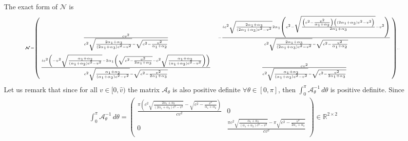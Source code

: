 \documentclass[10pt]{article}
\begin{document}
The exact form of $\boldsymbol{\mathcal{N}}$  is
\begin{align}
\!\!\begin{tiny}\boldsymbol{\mathcal{N}}\!=\!\!	\left(\!\!\!
	\begin{array}{cc}
		\frac{c v^2}{c^2 \sqrt{\frac{2 \alpha _1+\alpha _3}{\left(2 \alpha _1+\alpha _3\right) c^2-v^2}}-\sqrt{c^2-\frac{v^2}{\alpha _1+\alpha _2}}} & -\frac{i c^2 \sqrt{\frac{2 \alpha _1+\alpha _3}{\left(2 \alpha _1+\alpha _3\right) c^2-v^2}} 2 \alpha _1\left( c^2- \sqrt{\frac{\left(c^2-\frac{v^2}{\alpha _1+\alpha _2}\right) \left(\left(2 \alpha _1+\alpha _3\right) c^2-v^2\right)}{2 \alpha _1+\alpha _3}}-v^2\right)}{c^2 \sqrt{\frac{2 \alpha _1+\alpha _3}{\left(2 \alpha _1+\alpha _3\right) c^2-v^2}}-\sqrt{c^2-\frac{v^2}{\alpha _1+\alpha _2}}} \vspace{2mm}\\
		\frac{i c^2 \left(-v^2 \sqrt{\frac{\alpha _1+\alpha _2}{\left(\alpha _1+\alpha _2\right) c^2-v^2}}-2 \alpha _1 \left(\sqrt{c^2-\frac{v^2}{2 \alpha _1+\alpha _3}}-c^2 \sqrt{\frac{\alpha _1+\alpha _2}{\left(\alpha _1+\alpha _2\right) c^2-v^2}}\right)\right)}{c^2 \sqrt{\frac{\alpha _1+\alpha _2}{\left(\alpha _1+\alpha _2\right) c^2-v^2}}-\sqrt{c^2-\frac{v^2}{2 \alpha _1+\alpha _3}}} & \frac{c v^2}{c^2 \sqrt{\frac{\alpha _1+\alpha _2}{\left(\alpha _1+\alpha _2\right) c^2-v^2}}-\sqrt{c^2-\frac{v^2}{2 \alpha _1+\alpha _3}}} \\
	\end{array}
	\!\!\!\right)\!\!.\end{tiny}.
\end{align}
Let us remark that since for all $v\in[0,\widehat{v})$ the matrix $ \boldsymbol {\mathcal{A}}_  { \theta}$ is also positive definite $\forall \theta\in [0,\pi]$,  then $\int_{0}^{\pi}	  \boldsymbol {\mathcal{A}}_  { \theta} ^{-1}\, d\theta$ is positive definite. Since 
\begin{align}
\int_{0}^{\pi}	  \boldsymbol {\mathcal{A}}_  { \theta} ^{-1}\, d\theta=\left(
\begin{array}{cc}
	\frac{\pi  \left(c^2 \sqrt{\frac{2 \alpha _1+\alpha _3}{\left(2 \alpha _1+\alpha _3\right) c^2-v^2}}-\sqrt{c^2-\frac{v^2}{\alpha _1+\alpha _2}}\right)}{c v^2} & 0 \\
	0 & \frac{\pi  c^2 \sqrt{\frac{\alpha _1+\alpha _2}{\left(\alpha _1+\alpha _2\right) c^2-v^2}}-\pi  \sqrt{c^2-\frac{v^2}{2 \alpha _1+\alpha _3}}}{c v^2} \\
\end{array}
\right)\in \mathbb{R}^{2\times 2}
	\end{align}
\end{document}
